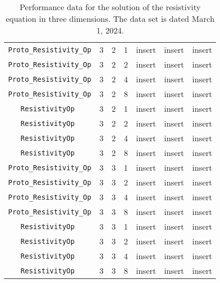 \documentclass{article}
\begin{document}
\begin{small}
\begin{table}
\begin{center}
\begin{tabular}{|c|c|c|c|c|c||c|}
\hline                                                                               
 {\tt Proto\_Resistivity\_Op} & 3 & 2   & 1    &  insert  &  insert    & insert    \\
 {\tt Proto\_Resistivity\_Op} & 3 & 2   & 2    &  insert  &  insert    & insert    \\
 {\tt Proto\_Resistivity\_Op} & 3 & 2   & 4    &  insert  &  insert    & insert    \\
 {\tt Proto\_Resistivity\_Op} & 3 & 2   & 8    &  insert  &  insert    & insert    \\
\hline                                                                               
 {\tt ResistivityOp         } & 3 & 2   & 1    &  insert  &  insert    & insert   \\
 {\tt ResistivityOp         } & 3 & 2   & 2    &  insert  &  insert    & insert   \\
 {\tt ResistivityOp         } & 3 & 2   & 4    &  insert  &  insert    & insert   \\
 {\tt ResistivityOp         } & 3 & 2   & 8    &  insert  &  insert    & insert   \\
 \hline                                                                              
 {\tt Proto\_Resistivity\_Op} & 3 & 3   & 1    &  insert  &  insert    & insert    \\
 {\tt Proto\_Resistivity\_Op} & 3 & 3   & 2    &  insert  &  insert    & insert    \\
 {\tt Proto\_Resistivity\_Op} & 3 & 3   & 4    &  insert  &  insert    & insert    \\
 {\tt Proto\_Resistivity\_Op} & 3 & 3   & 8    &  insert  &  insert    & insert    \\
\hline                                                                               
 {\tt ResistivityOp         } & 3 & 3   & 1    &  insert  &  insert    & insert   \\
 {\tt ResistivityOp         } & 3 & 3   & 2    &  insert  &  insert    & insert   \\
 {\tt ResistivityOp         } & 3 & 3   & 4    &  insert  &  insert    & insert   \\
 {\tt ResistivityOp         } & 3 & 3   & 8    &  insert  &  insert    & insert   \\
 \hline
\end{tabular}
\end{center}
\label{tab::resist_3d}
\caption
    {
      Performance data for the solution of the resistivity
      equation in three dimensions.
      The data set is dated March 1, 2024.
    }
\end{table}
\end{small}


\end{document}
